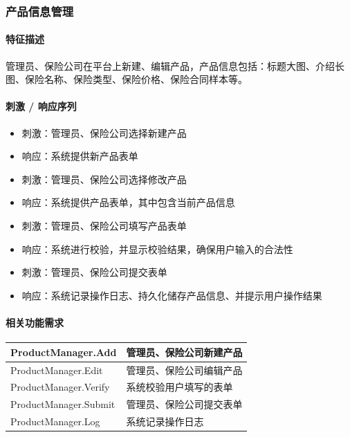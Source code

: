 \documentclass[a4paper]{ctexart}
\begin{document}
\subsubsection{产品信息管理}

\paragraph{特征描述}

管理员、保险公司在平台上新建、编辑产品，产品信息包括：标题大图、介绍长图、保险名称、保险类型、保险价格、保险合同样本等。

\paragraph{刺激 / 响应序列}

\begin{itemize}
    \item 刺激：管理员、保险公司选择新建产品
    \item 响应：系统提供新产品表单
    \item 刺激：管理员、保险公司选择修改产品
    \item 响应：系统提供产品表单，其中包含当前产品信息
    \item 刺激：管理员、保险公司填写产品表单
    \item 响应：系统进行校验，并显示校验结果，确保用户输入的合法性
    \item 刺激：管理员、保险公司提交表单
    \item 响应：系统记录操作日志、持久化储存产品信息、并提示用户操作结果
\end{itemize}

\paragraph{相关功能需求}

\begin{center}
  \begin{tabular}{p{6cm}|p{8cm}}
    \toprule
    ProductManager.Add        & 管理员、保险公司新建产品 \\
    \midrule
    ProductManager.Edit       & 管理员、保险公司编辑产品 \\
    \midrule
    ProductManager.Verify & 系统校验用户填写的表单           \\
    \midrule
    ProductManager.Submit & 管理员、保险公司提交表单           \\
    \midrule
    ProductManager.Log & 系统记录操作日志          \\
    \bottomrule
  \end{tabular}
\end{center}
\end{document}
